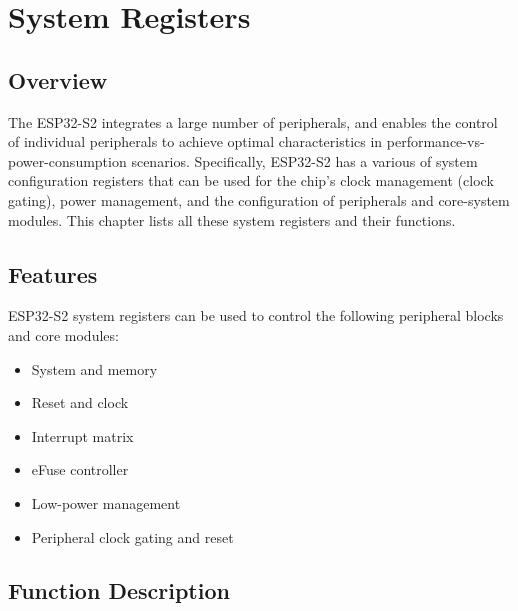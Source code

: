 \documentclass[main\_\_EN.tex]{subfiles}
\begin{document}
\setenglishformatting

\ifglobal
\else
    \listoftodos
    {\let\clearpage\relax \listofdonetodos}
    \tableofcontents
\fi




\hypertarget{sysreg}{}
\chapter{System Registers}
\label{mod:sysreg}


\section{Overview}

The ESP32-S2 integrates a large number of peripherals, and enables the control of individual peripherals to achieve optimal characteristics in performance-vs-power-consumption scenarios. Specifically, ESP32-S2 has a various of system configuration registers that can be used for the chip's clock management (clock gating), power management, and the configuration of peripherals and core-system modules. This chapter lists all these system registers and their functions.

\section{Features}

ESP32-S2 system registers can be used to control the following peripheral blocks and core modules:

\begin{itemize}
    \item System and memory
    \item Reset and clock
    \item Interrupt matrix
    \item eFuse controller
    \item Low-power management
    \item Peripheral clock gating and reset
\end{itemize}


\section{Function Description}
\end{document}
